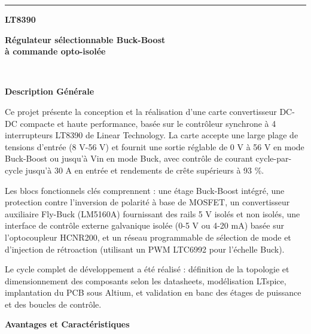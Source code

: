 \begin{titlepage}
	\noindent\rule{\textwidth}{1pt}
    \noindent
    \begin{minipage}[t]{0.48\textwidth}
      \textbf{LT8390}
    \end{minipage}%
    \hfill%
    \begin{minipage}[t]{0.48\textwidth}
      \raggedleft
      \textbf{Régulateur sélectionnable Buck-Boost} \\
	  \textbf{à commande opto-isolée}
    \end{minipage}\\[0.5em]

    \vspace{1cm}

    \noindent
    \begin{minipage}[t]{0.48\textwidth}
	\textbf{Description Générale}

	\vspace{0.5cm}

	Ce projet présente la conception et la réalisation d'une carte convertisseur DC-DC compacte et haute performance, basée sur le contrôleur synchrone à 4 interrupteurs LT8390 de Linear Technology. La carte accepte une large plage de tensions d'entrée (8 V-56 V) et fournit une sortie réglable de 0 V à 56 V en mode Buck-Boost ou jusqu'à Vin en mode Buck, avec contrôle de courant cycle-par-cycle jusqu'à 30 A en entrée et rendements de crête supérieurs à 93 \%.

	\vspace{0.3cm}

	Les blocs fonctionnels clés comprennent : une étage Buck-Boost intégré, une protection contre l'inversion de polarité à base de MOSFET, un convertisseur auxiliaire Fly-Buck (LM5160A) fournissant des rails 5 V isolés et non isolés, une interface de contrôle externe galvanique isolée (0-5 V ou 4-20 mA) basée sur l'optocoupleur HCNR200, et un réseau programmable de sélection de mode et d'injection de rétroaction (utilisant un PWM LTC6992 pour l'échelle Buck).

	\vspace{0.3cm}

	Le cycle complet de développement a été réalisé : définition de la topologie et dimensionnement des composants selon les datasheets, modélisation LTspice, implantation du PCB sous Altium, et validation en banc des étages de puissance et des boucles de contrôle.

	\end{minipage}%
	\hfill%
	\begin{minipage}[t]{0.48\textwidth}
	\textbf{Avantages et Caractéristiques}


\end{minipage}
\end{titlepage}
